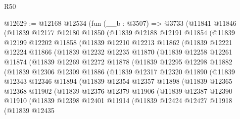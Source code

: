 \begin{lexlean}{R50}
\begin{coremodule}
@12629 := @12168
    @12534
    (fun (__b : @3507) =>
    @3733
      (@11841
        @11846
        (@11839
          @12177
          @12180
          @11850
          (@11839
            @12188
            @12191
            @11854
            (@11839
              @12199
              @12202
              @11858
              (@11839
                @12210
                @12213
                @11862
                (@11839
                  @12221
                  @12224
                  @11866
                  (@11839
                    @12232
                    @12235
                    @11870
                    (@11839
                      @12258
                      @12261
                      @11874
                      (@11839
                        @12269
                        @12272
                        @11878
                        (@11839
                          @12295
                          @12298
                          @11882
                          (@11839
                            @12306
                            @12309
                            @11886
                            (@11839
                              @12317
                              @12320
                              @11890
                              (@11839
                                @12343
                                @12346
                                @11894
                                (@11839
                                  @12354
                                  @12357
                                  @11898
                                  (@11839
                                    @12365
                                    @12368
                                    @11902
                                    (@11839
                                      @12376
                                      @12379
                                      @11906
                                      (@11839
                                        @12387
                                        @12390
                                        @11910
                                        (@11839
                                          @12398
                                          @12401
                                          @11914
                                          (@11839
                                            @12424
                                            @12427
                                            @11918
                                            (@11839
                                              @12435

\end{coremodule}
\end{lexlean}
